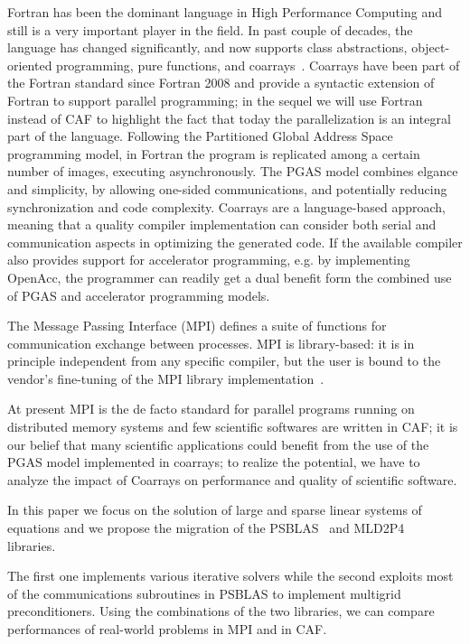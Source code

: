 \documentclass{IOS-Book-Article}
\begin{document}
Fortran has been the dominant language in High Performance
Computing and still is a very important player in the field. In past
couple of decades, the language has changed significantly,  and now 
supports class abstractions, object-oriented programming, pure
functions, and coarrays~\cite{Metcalf:2011:MFE}.  
Coarrays have been part of the Fortran standard since
Fortran 2008 and provide a syntactic extension of Fortran to
support parallel programming; in the sequel we will use Fortran
instead of CAF to highlight the fact that today the parallelization is
an integral part of the language.
Following the  Partitioned Global Address Space programming model,
in Fortran the program is replicated among a certain number of images,
executing asynchronously. 
The PGAS model combines elgance  and simplicity, by allowing one-sided
communications, and potentially reducing synchronization and code 
complexity. 
Coarrays are  a language-based approach, meaning that a quality
compiler implementation can consider both serial and communication
aspects in optimizing the generated code.
If the available  compiler also provides support for accelerator
programming, e.g. by implementing OpenAcc, the programmer can readily
get a dual benefit form the combined use of PGAS and accelerator
programming models. 


The Message Passing Interface (MPI) defines a suite of functions for
communication exchange between processes. MPI  is
library-based:  it is in principle independent from any specific
compiler, but the user  is bound to the vendor's fine-tuning of the
MPI library implementation~\cite{Garain:2015}.

At present  MPI is the de facto standard for parallel programs running
on distributed memory systems and few scientific softwares are written in
CAF; it is our belief that many scientific applications could
benefit from the use of the PGAS model implemented in coarrays; to
realize the potential, we have to analyze the impact of 
 Coarrays  on performance and quality of scientific software.

In this paper we focus on the solution of large and sparse linear
systems of equations and we propose the migration of the
PSBLAS~\cite{PSBLAS} and MLD2P4~\cite{mld-toms} libraries.

The first one implements various iterative solvers while the second
exploits most of the communications subroutines in PSBLAS to implement
multigrid preconditioners. Using the combinations of the two
libraries, we can compare performances of real-world problems in MPI
and in CAF.
\end{document}

